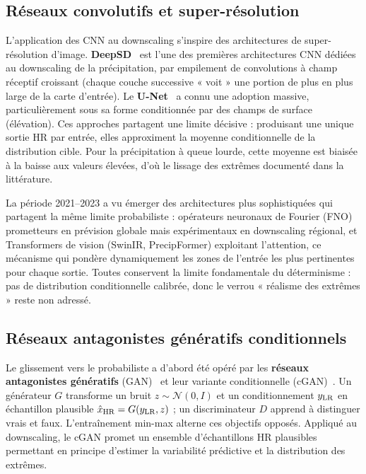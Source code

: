 \subsection{Réseaux convolutifs et super-résolution}
\label{ssec:soa-cnn}

L'application des CNN au downscaling s'inspire des architectures de super-résolution d'image. \textbf{DeepSD}~\cite{vandal_deepsd_2017} est l'une des premières architectures CNN dédiées au downscaling de la précipitation, par empilement de convolutions à champ réceptif croissant (chaque couche successive « voit » une portion de plus en plus large de la carte d'entrée). Le \textbf{U-Net}~\cite{ronneberger_unet_2015} a connu une adoption massive, particulièrement sous sa forme conditionnée par des champs de surface (élévation). Ces approches partagent une limite décisive : produisant une unique sortie HR par entrée, elles approximent la moyenne conditionnelle de la distribution cible. Pour la précipitation à queue lourde, cette moyenne est biaisée à la baisse aux valeurs élevées, d'où le lissage des extrêmes documenté dans la littérature.

La période 2021--2023 a vu émerger des architectures plus sophistiquées qui partagent la même limite probabiliste : opérateurs neuronaux de Fourier (FNO) prometteurs en prévision globale mais expérimentaux en downscaling régional, et Transformers de vision (SwinIR, PrecipFormer) exploitant l'attention, ce mécanisme qui pondère dynamiquement les zones de l'entrée les plus pertinentes pour chaque sortie. Toutes conservent la limite fondamentale du déterminisme : pas de distribution conditionnelle calibrée, donc le verrou « réalisme des extrêmes » reste non adressé.

\label{sec:soa-adv}

\subsection{Réseaux antagonistes génératifs conditionnels}
\label{ssec:soa-cgan}

Le glissement vers le probabiliste a d'abord été opéré par les \textbf{réseaux antagonistes génératifs} (GAN)~\cite{goodfellow_gan_2014} et leur variante conditionnelle (cGAN)~\cite{mirza_cgan_2014}. Un générateur $G$ transforme un bruit $z \sim \mathcal{N}(0,I)$ et un conditionnement $y_{\text{LR}}$ en échantillon plausible $\hat{x}_{\text{HR}} = G(y_{\text{LR}}, z)$ ; un discriminateur $D$ apprend à distinguer vrais et faux. L'entraînement min-max alterne ces objectifs opposés. Appliqué au downscaling, le cGAN promet un ensemble d'échantillons HR plausibles permettant en principe d'estimer la variabilité prédictive et la distribution des extrêmes.

